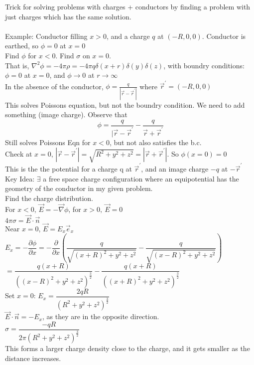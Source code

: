 \documentclass[a4paper,11pt]{article}
\newcommand{\pd}[2]{\dfrac{\partial #1}{\partial #2}}
\newcommand{\Nab}{\vec{\nabla}}
\newcommand{\dop}[2]{\vec{#1}\cdot\vec{#2}}
\newcommand{\lap}{\nabla^2}
\begin{document}
Trick for solving problems with charges + conductors by finding a problem with just charges which has the same solution.\\
\\
Example: Conductor filling $x>0$, and a charge $q$ at $(-R,0,0)$. Conductor is earthed, so $\phi=0$ at $x=0$\\
Find $\phi$ for $x<0$. Find $\sigma$ on $x=0$.\\
That is, $\lap\phi=-4\pi\rho=-4\pi q\delta(x+r)\delta(y)\delta(z)$, with boundry conditions: $\phi=0$ at $x=0$, and $\phi\rightarrow 0$ at $r\rightarrow \infty$\\
In the absence of the conductor, $\phi=\frac{q}{|\vec{r}-\vec{r}^\prime|}$ where $\vec{r}^\prime=(-R,0,0)$\\
This solves Poissons equation, but not the boundry condition. We need to add something (image charge). Observe that
$$\phi=\frac{q}{|\vec{r}-\vec{r}^\prime}-\frac{q}{\vec{r}+\vec{r}^\prime}$$
Still solves Poissons Eqn for $x<0$, but not also satisfies the b.c.\\
Check at $x=0$, $|\vec{r}-\vec{r}^\prime|=\sqrt{R^2+y^2+z^2}=|\vec{r}+\vec{r}^\prime|$. So $\phi(x=0)=0$\\
This is the the potential for a charge q at $\vec{r}^\prime$, and an image charge $-q$ at $-\vec{r}^\prime$\\
Key Idea: $\exists$ a free space charge configuration where an equipotential has the geometry of the conductor in my given problem.\\
Find the charge distribution.\\
For $x<0$, $\vec{E}=-\Nab\phi$, for $x>0,~\vec{E}=0$\\
$4\pi\sigma=\dop{E}{n}$\\
Near $x=0$, $\vec{E}=E_x\vec{e}_x$\\
$E_x=-\pd{\phi}{x}=-\pd{}{x}(\dfrac{q}{\sqrt{(x+R)^2+y^2+z^2}}-\dfrac{q}{\sqrt{(x-R)^2+y^2+z^2}})$\\
$=\dfrac{q(x+R)}{((x-R)^2+y^2+z^2)^\frac{3}{2}}-\dfrac{q(x+R)}{((x+R)^2+y^2+z^2)^\frac{3}{2}}$\\
Set $x=0$: $E_x=\dfrac{2qR}{(R^2+y^2+z^2)^\frac{3}{2}}$\\
$\dop{E}{n}=-E_x$, as they are in the opposite direction.\\
$\sigma=\dfrac{-qR}{2\pi(R^2+y^2+z^2)^\frac{3}{2}}$\\
This forms a larger charge density close to the charge, and it gets smaller as the distance increases.\\
\\
\end{document}
